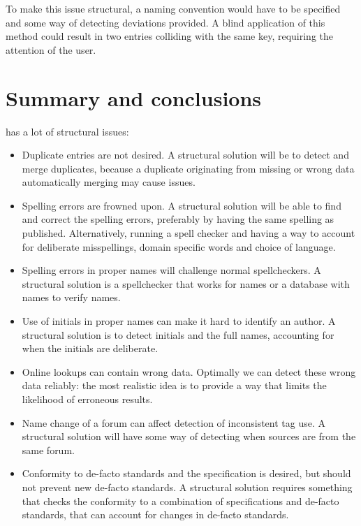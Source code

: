 To make this issue structural, a naming convention would have to be
specified and some way of detecting deviations provided.  A blind
application of this method could result in two entries colliding with
the same key, requiring the attention of the user.


\section{Summary and conclusions}
\label{sec:problems_conclusion}

{\bibtex} has a lot of structural issues:

\begin{itemize}
\item Duplicate entries are not desired.  A structural solution will
  be to detect and merge duplicates, because a duplicate originating
  from missing or wrong data automatically merging may cause issues.

\item Spelling errors are frowned upon.  A structural solution will be
  able to find and correct the spelling errors, preferably by having
  the same spelling as published.  Alternatively, running a spell
  checker and having a way to account for deliberate misspellings,
  domain specific words and choice of language.

\item Spelling errors in proper names will challenge normal
  spellcheckers.  A structural solution is a spellchecker that works
  for names or a database with names to verify names.

\item Use of initials in proper names can make it hard to identify an
  author.  A structural solution is to detect initials and the full
  names, accounting for when the initials are deliberate.

\item Online lookups can contain wrong data.  Optimally we can detect
  these wrong data reliably: the most realistic idea is to provide a
  way that limits the likelihood of erroneous results.

\item Name change of a forum can affect detection of inconsistent tag
  use.  A structural solution will have some way of detecting when
  sources are from the same forum.

\item Conformity to de-facto standards and the {\bibtex} specification
  is desired, but should not prevent new de-facto standards.  A
  structural solution requires something that checks the conformity to
  a combination of specifications and de-facto standards, that can
  account for changes in de-facto standards.


\end{itemize}
